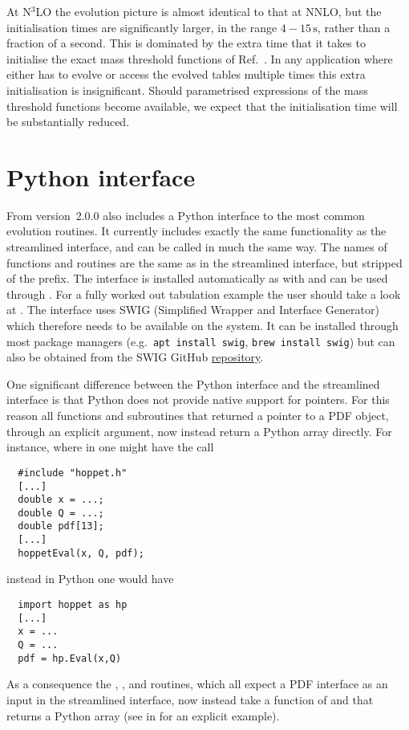 At N$^3$LO the evolution picture is almost identical to that at NNLO,
but the initialisation times are significantly larger, in the range
$4-15\, \mathrm{s}$, rather than a fraction of a second.
%
This is dominated by the extra time that it takes
to initialise the exact mass threshold functions of
Ref.~\cite{BlumleinCode}.
%
In any application where \hoppet{} either
has to evolve or access the evolved tables multiple times this extra
initialisation is insignificant.
%
Should parametrised expressions of the mass threshold functions become
available, we expect that the initialisation time will be
substantially reduced.


\section{Python interface}
\label{sec:pyinterface}
From version~2.0.0 \hoppet also includes a Python interface to the
most common evolution routines. It currently includes exactly the same
functionality as the streamlined interface, and can be called in much
the same way. The names of functions and routines are the same as in
the streamlined interface, but stripped of the 
prefix. The interface is installed automatically as  with
 and can be used through . For a fully
worked out tabulation example the user should take a look at
. The
interface uses SWIG (Simplified Wrapper and Interface Generator) which
therefore needs to be available on the system. It can be installed
through most package managers (e.g.\ \texttt{apt install swig},
\texttt{brew install swig}) but
can also be obtained from the SWIG GitHub
\href{https://github.com/swig}{repository}.

One significant difference between the Python interface and the
streamlined interface is that Python does not provide native support
for pointers. For this reason all functions and subroutines that
returned a pointer to a PDF object, through an explicit argument, now
instead return a Python array directly. For instance, where in \CPP{}
one might have the call
%
\begin{lstlisting}
  #include "hoppet.h"
  [...]
  double x = ...;
  double Q = ...;
  double pdf[13];
  [...]
  hoppetEval(x, Q, pdf);
\end{lstlisting}
%
instead in Python one would have
%
\begin{lstlisting}
  import hoppet as hp
  [...]
  x = ...
  Q = ...
  pdf = hp.Eval(x,Q)
\end{lstlisting}
As a consequence the , , and
 routines, which all expect a PDF interface as an input in
the streamlined interface, now instead take a function of  and
 that returns a Python array (see  in
for an explicit example).

